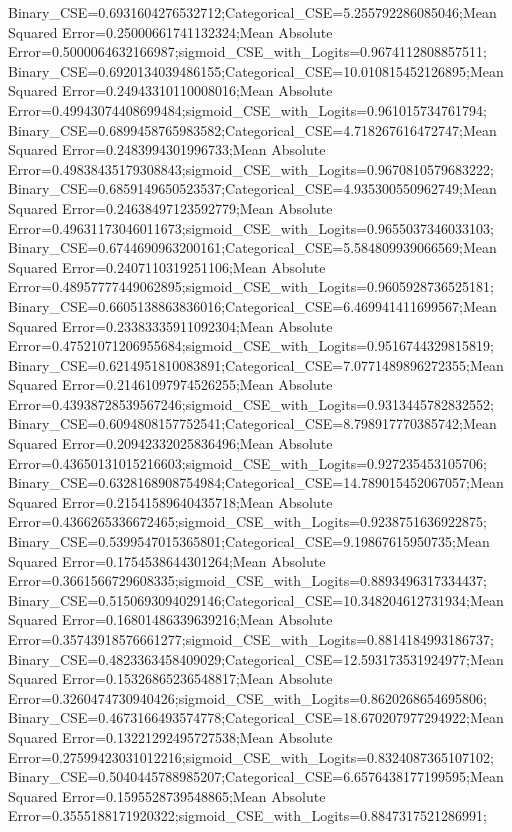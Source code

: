 Binary_CSE=0.6931604276532712;Categorical_CSE=5.255792286085046;Mean Squared Error=0.25000661741132324;Mean Absolute Error=0.5000064632166987;sigmoid_CSE_with_Logits=0.9674112808857511;
Binary_CSE=0.6920134039486155;Categorical_CSE=10.010815452126895;Mean Squared Error=0.24943310110008016;Mean Absolute Error=0.49943074408699484;sigmoid_CSE_with_Logits=0.961015734761794;
Binary_CSE=0.6899458765983582;Categorical_CSE=4.718267616472747;Mean Squared Error=0.2483994301996733;Mean Absolute Error=0.49838435179308843;sigmoid_CSE_with_Logits=0.9670810579683222;
Binary_CSE=0.6859149650523537;Categorical_CSE=4.935300550962749;Mean Squared Error=0.24638497123592779;Mean Absolute Error=0.49631173046011673;sigmoid_CSE_with_Logits=0.9655037346033103;
Binary_CSE=0.6744690963200161;Categorical_CSE=5.584809939066569;Mean Squared Error=0.2407110319251106;Mean Absolute Error=0.48957777449062895;sigmoid_CSE_with_Logits=0.9605928736525181;
Binary_CSE=0.6605138863836016;Categorical_CSE=6.469941411699567;Mean Squared Error=0.23383335911092304;Mean Absolute Error=0.47521071206955684;sigmoid_CSE_with_Logits=0.9516744329815819;
Binary_CSE=0.6214951810083891;Categorical_CSE=7.0771489896272355;Mean Squared Error=0.21461097974526255;Mean Absolute Error=0.43938728539567246;sigmoid_CSE_with_Logits=0.9313445782832552;
Binary_CSE=0.6094808157752541;Categorical_CSE=8.798917770385742;Mean Squared Error=0.20942332025836496;Mean Absolute Error=0.43650131015216603;sigmoid_CSE_with_Logits=0.927235453105706;
Binary_CSE=0.6328168908754984;Categorical_CSE=14.789015452067057;Mean Squared Error=0.21541589640435718;Mean Absolute Error=0.4366265336672465;sigmoid_CSE_with_Logits=0.9238751636922875;
Binary_CSE=0.5399547015365801;Categorical_CSE=9.19867615950735;Mean Squared Error=0.1754538644301264;Mean Absolute Error=0.3661566729608335;sigmoid_CSE_with_Logits=0.8893496317334437;
Binary_CSE=0.5150693094029146;Categorical_CSE=10.348204612731934;Mean Squared Error=0.16801486339639216;Mean Absolute Error=0.35743918576661277;sigmoid_CSE_with_Logits=0.8814184993186737;
Binary_CSE=0.4823363458409029;Categorical_CSE=12.593173531924977;Mean Squared Error=0.15326865236548817;Mean Absolute Error=0.3260474730940426;sigmoid_CSE_with_Logits=0.8620268654695806;
Binary_CSE=0.4673166493574778;Categorical_CSE=18.670207977294922;Mean Squared Error=0.13221292495727538;Mean Absolute Error=0.27599423031012216;sigmoid_CSE_with_Logits=0.8324087365107102;
Binary_CSE=0.5040445788985207;Categorical_CSE=6.6576438177199595;Mean Squared Error=0.1595528739548865;Mean Absolute Error=0.3555188171920322;sigmoid_CSE_with_Logits=0.8847317521286991;
